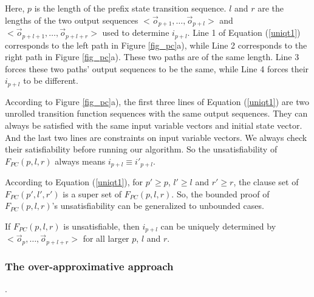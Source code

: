 \documentclass[runningheads,a4paper,orivec]{llncs}
\begin{document}
Here,
$p$ is the length of the prefix state transition sequence.
$l$ and $r$ are the lengths of the two output sequences 
$<\vec{o}_{p+1},\dots,\vec{o}_{p+l}>$ and $<\vec{o}_{p+l+1},\dots,\vec{o}_{p+l+r}>$
used to determine $i_{p+l}$.
Line 1 of Equation (\ref{uniqt1}) corresponds to the left path in Figure \ref{fig_pc}a),
while Line 2 corresponds to the right path in Figure \ref{fig_pc}a).
These two paths are of the same length.
Line 3 forces these two paths' output sequences to be the same,
while Line 4 forces their $i_{p+l}$ to be different.


According to Figure \ref{fig_pc}a),
the first three lines of Equation (\ref{uniqt1}) are two unrolled transition function sequences with the same output sequences.
They can always be satisfied with the same input variable vectors and initial state vector.
And the last two lines are constraints on input variable vectors.
We always check their satisfiability before running our algorithm.
So the unsatisfiability of $F_{PC}(p,l,r)$ always means $i_{p+l}\equiv i'_{p+l}$.


According to Equation (\ref{uniqt1}),
for $p'\ge p$, $l'\ge l$ and $r'\ge r$,
the clause set of $F_{PC}(p',l',r')$ is a super set of $F_{PC}(p,l,r)$.
So,
the bounded proof of $F_{PC}(p,l,r)$'s unsatisfiability
can be generalized to unbounded cases.

\begin{proposition}\label{prop_pc1}
If $F_{PC}(p,l,r)$ is unsatisfiable,
then $i_{p+l}$ can be uniquely determined by $<\vec{o}_{p},\dots,\vec{o}_{p+l+r}>$ for all larger $p$, $l$ and $r$.
\end{proposition}



\subsubsection{The over-approximative approach}\label{subsub_complete}.
\end{document}
